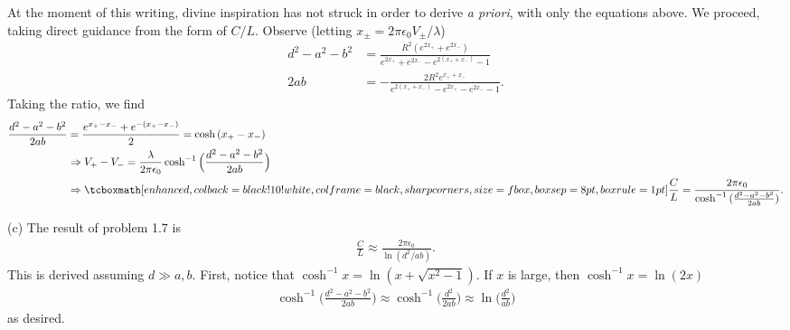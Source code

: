 {At the moment of this writing, divine inspiration has not struck in order to derive  \textit{a priori}, with only the equations above.
We proceed, taking direct guidance from the form of $C/L$.
Observe (letting $x_{\pm} = 2 \pi \epsilon_0 V_{\pm} / \lambda$)
\begin{align}
    d^2 - a^2 - b^2 &= \frac{R^2 (e^{2x_{+}} + e^{2 x_{-}})}{e^{2x_{+}} + e^{2x_{-}} - e^{2(x_{+}+x_{-})} - 1} \\
    2ab &= -\frac{2 R^2 e^{x_{+} + x_{-}}}{e^{2(x_{+} + x_{-})} - e^{2x_{+}} - e^{2x_{-}} - 1}
.\end{align}
Taking the ratio, we find
\begin{eqnarray}
    \begin{aligned}
        \frac{d^2 - a^2 - b^2}{2ab} &= \frac{e^{x_{+} - x_{-}} + e^{-(x_{+} - x_{-})}}{2} = \cosh{(x_{+} - x_{-})} \\
                                    &\Rightarrow V_{+} - V_{-} = \frac{\lambda}{2 \pi \epsilon_0} \cosh^{-1}{\Big( \frac{d^2 - a^2 - b^2}{2ab} \Big)} \\
                                    &\Rightarrow \eqbox{ \frac{C}{L} = \frac{2 \pi \epsilon_0}{\cosh^{-1}{(\frac{d^2 - a^2 - b^2}{2 a b})}} }
    .\end{aligned}
\end{eqnarray}

(c) The result of problem 1.7 is
\begin{eqnarray}
    \frac{C}{L} \approx \frac{2\pi \epsilon_0}{\ln(d^2/ab)}
.\end{eqnarray}
This is derived assuming $d \gg a,b$.
First, notice that $\cosh^{-1}{x} = \ln{(x + \sqrt{x^2 - 1})}$.
If $x$ is large, then $\cosh^{-1}{x} = \ln{(2x)}$
\begin{eqnarray}
    \cosh^{-1}{\Big( \frac{d^2 - a^2 - b^2}{2ab} \Big)} \approx \cosh^{-1}{\Big( \frac{d^2}{2ab} \Big)} \approx \ln{\Big( \frac{d^2}{ab} \Big)}
\end{eqnarray}
as desired.

}
